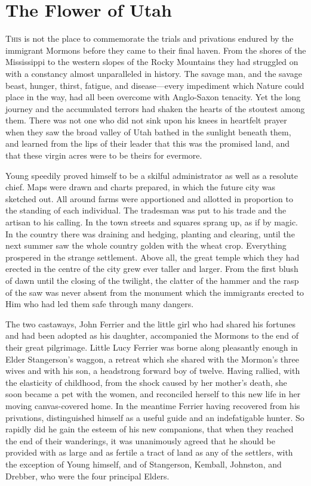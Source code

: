 \chapter{The Flower of Utah}
	\lettrine{T}{his} is not the place to commemorate the trials and privations endured by the immigrant Mormons before they came to their final haven. From the shores of the Mississippi to the western slopes of the Rocky Mountains they had struggled on with a constancy almost unparalleled in history. The savage man, and the savage beast, hunger, thirst, fatigue, and disease—every impediment which Nature could place in the way, had all been overcome with Anglo-Saxon tenacity. Yet the long journey and the accumulated terrors had shaken the hearts of the stoutest among them. There was not one who did not sink upon his knees in heartfelt prayer when they saw the broad valley of Utah bathed in the sunlight beneath them, and learned from the lips of their leader that this was the promised land, and that these virgin acres were to be theirs for evermore.

Young speedily proved himself to be a skilful administrator as well as a resolute chief. Maps were drawn and charts prepared, in which the future city was sketched out. All around farms were apportioned and allotted in proportion to the standing of each individual. The tradesman was put to his trade and the artisan to his calling. In the town streets and squares sprang up, as if by magic. In the country there was draining and hedging, planting and clearing, until the next summer saw the whole country golden with the wheat crop. Everything prospered in the strange settlement. Above all, the great temple which they had erected in the centre of the city grew ever taller and larger. From the first blush of dawn until the closing of the twilight, the clatter of the hammer and the rasp of the saw was never absent from the monument which the immigrants erected to Him who had led them safe through many dangers.

The two castaways, John Ferrier and the little girl who had shared his fortunes and had been adopted as his daughter, accompanied the Mormons to the end of their great pilgrimage. Little Lucy Ferrier was borne along pleasantly enough in Elder Stangerson's waggon, a retreat which she shared with the Mormon's three wives and with his son, a headstrong forward boy of twelve. Having rallied, with the elasticity of childhood, from the shock caused by her mother's death, she soon became a pet with the women, and reconciled herself to this new life in her moving canvas-covered home. In the meantime Ferrier having recovered from his privations, distinguished himself as a useful guide and an indefatigable hunter. So rapidly did he gain the esteem of his new companions, that when they reached the end of their wanderings, it was unanimously agreed that he should be provided with as large and as fertile a tract of land as any of the settlers, with the exception of Young himself, and of Stangerson, Kemball, Johnston, and Drebber, who were the four principal Elders.

